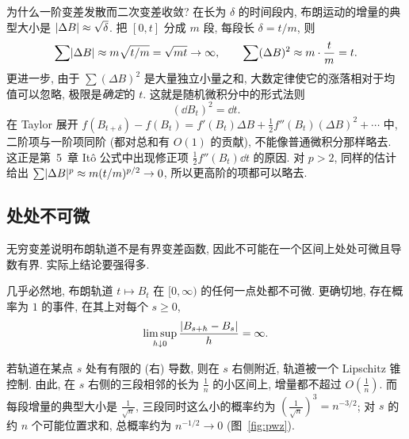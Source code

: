 \begin{intuition}
为什么一阶变差发散而二次变差收敛? 在长为 $\delta$ 的时间段内, 布朗运动的增量的典型大小是 $\lvert\Delta B\rvert\approx\sqrt{\delta}$. 把 $[0,t]$ 分成 $m$ 段, 每段长 $\delta=t/m$, 则
\[
\sum\lvert\Delta B\rvert\approx m\sqrt{t/m}=\sqrt{mt}\to\infty,\qquad\sum(\Delta B)^2\approx m\cdot\frac{t}{m}=t.
\]
更进一步, 由于 $\sum(\Delta B)^2$ 是大量独立小量之和, 大数定律使它的涨落相对于均值可以忽略, 极限是\emph{确定}的 $t$. 这就是随机微积分中的形式法则
\[
(\dd B_t)^2=\dd t.
\]
在 Taylor 展开 $f(B_{t+\delta})-f(B_t)=f'(B_t)\Delta B+\frac{1}{2}f''(B_t)(\Delta B)^2+\cdots$ 中, 二阶项与一阶项同阶 (都对总和有 $O(1)$ 的贡献), 不能像普通微积分那样略去. 这正是第~5~章 It\^o 公式中出现修正项 $\frac{1}{2}f''(B_t)\dd t$ 的原因. 对 $p>2$, 同样的估计给出 $\sum\lvert\Delta B\rvert^p\approx m(t/m)^{p/2}\to0$, 所以更高阶的项都可以略去.
\end{intuition}

\subsection{处处不可微}

无穷变差说明布朗轨道不是有界变差函数, 因此不可能在一个区间上处处可微且导数有界. 实际上结论要强得多.

\begin{theorem}\label{thm:nowhere-diff}
几乎必然地, 布朗轨道 $t\mapsto B_t$ 在 $[0,\infty)$ 的任何一点处都不可微. 更确切地, 存在概率为 $1$ 的事件, 在其上对每个 $s\ge0$,
\[
\limsup_{h\downarrow0}\frac{\lvert B_{s+h}-B_s\rvert}{h}=\infty.
\]
\end{theorem}

若轨道在某点 $s$ 处有有限的 (右) 导数, 则在 $s$ 右侧附近, 轨道被一个 Lipschitz 锥控制. 由此, 在 $s$ 右侧的三段相邻的长为 $\frac{1}{n}$ 的小区间上, 增量都不超过 $O(\frac{1}{n})$. 而每段增量的典型大小是 $\frac{1}{\sqrt{n}}$, 三段同时这么小的概率约为 $(\frac{1}{\sqrt{n}})^3=n^{-3/2}$; 对 $s$ 的约 $n$ 个可能位置求和, 总概率约为 $n^{-1/2}\to0$ (图~\ref{fig:pwz}).

